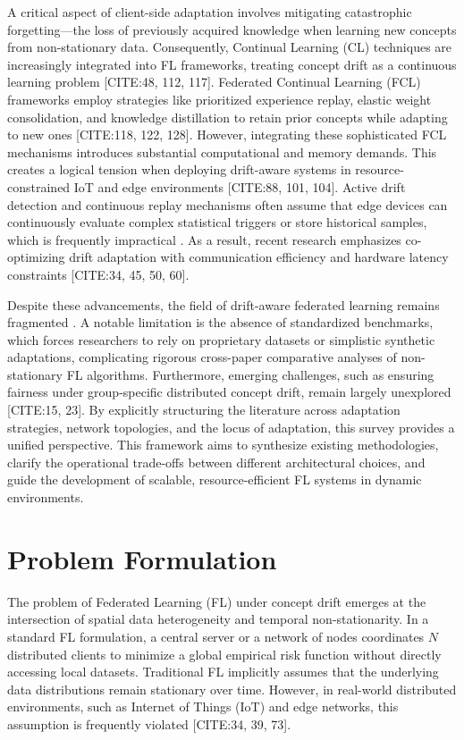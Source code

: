\documentclass[journal]{IEEEtran}
\begin{document}
A critical aspect of client-side adaptation involves mitigating catastrophic forgetting—the loss of previously acquired knowledge when learning new concepts from non-stationary data. Consequently, Continual Learning (CL) techniques are increasingly integrated into FL frameworks, treating concept drift as a continuous learning problem [CITE:48, 112, 117]. Federated Continual Learning (FCL) frameworks employ strategies like prioritized experience replay, elastic weight consolidation, and knowledge distillation to retain prior concepts while adapting to new ones [CITE:118, 122, 128]. However, integrating these sophisticated FCL mechanisms introduces substantial computational and memory demands. This creates a logical tension when deploying drift-aware systems in resource-constrained IoT and edge environments [CITE:88, 101, 104]. Active drift detection and continuous replay mechanisms often assume that edge devices can continuously evaluate complex statistical triggers or store historical samples, which is frequently impractical \cite{ren2025}. As a result, recent research emphasizes co-optimizing drift adaptation with communication efficiency and hardware latency constraints [CITE:34, 45, 50, 60].

Despite these advancements, the field of drift-aware federated learning remains fragmented \cite{Mahdi2025}. A notable limitation is the absence of standardized benchmarks, which forces researchers to rely on proprietary datasets or simplistic synthetic adaptations, complicating rigorous cross-paper comparative analyses of non-stationary FL algorithms. Furthermore, emerging challenges, such as ensuring fairness under group-specific distributed concept drift, remain largely unexplored [CITE:15, 23]. By explicitly structuring the literature across adaptation strategies, network topologies, and the locus of adaptation, this survey provides a unified perspective. This framework aims to synthesize existing methodologies, clarify the operational trade-offs between different architectural choices, and guide the development of scalable, resource-efficient FL systems in dynamic environments.

\section{Problem Formulation}
\label{sec:problem_formulation}

The problem of Federated Learning (FL) under concept drift emerges at the intersection of spatial data heterogeneity and temporal non-stationarity. In a standard FL formulation, a central server or a network of nodes coordinates $N$ distributed clients to minimize a global empirical risk function without directly accessing local datasets. Traditional FL implicitly assumes that the underlying data distributions remain stationary over time. However, in real-world distributed environments, such as Internet of Things (IoT) and edge networks, this assumption is frequently violated [CITE:34, 39, 73]. 
\end{document}
